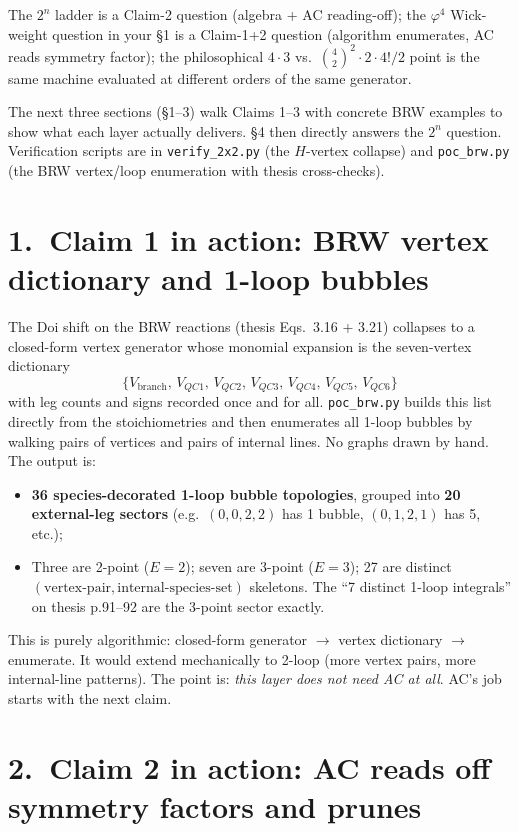 \documentclass[11pt,a4paper]{article}
\begin{document}
\noindent
The $2^n$ ladder is a Claim-2 question (algebra + AC reading-off); the
$\varphi^4$ Wick-weight question in your \S1 is a Claim-1+2 question (algorithm
enumerates, AC reads symmetry factor); the philosophical $4 \cdot 3$ vs.\
$\binom{4}{2}^2 \cdot 2 \cdot 4!/2$ point is the same machine evaluated at
different orders of the same generator.

\medskip
\noindent
The next three sections (\S 1--3) walk Claims 1--3 with concrete BRW examples
to show what each layer actually delivers.  \S 4 then directly answers the
$2^n$ question.  Verification scripts are in
\texttt{verify\_2x2.py} (the $H$-vertex collapse) and \texttt{poc\_brw.py}
(the BRW vertex/loop enumeration with thesis cross-checks).

\section*{1.\ Claim 1 in action: BRW vertex dictionary and 1-loop bubbles}

The Doi shift on the BRW reactions (thesis Eqs.\ 3.16 + 3.21) collapses to a
closed-form vertex generator whose monomial expansion is the seven-vertex
dictionary
\[
\bigl\{V_{\text{branch}},\,V_{QC1},\,V_{QC2},\,V_{QC3},\,V_{QC4},\,V_{QC5},\,V_{QC6}\bigr\}
\]
with leg counts and signs recorded once and for all.
\texttt{poc\_brw.py} builds this list directly from the stoichiometries and
then enumerates all 1-loop bubbles by walking pairs of vertices and pairs of
internal lines.  No graphs drawn by hand.  The output is:
\begin{itemize}[leftmargin=2em,itemsep=2pt]
  \item \textbf{36 species-decorated 1-loop bubble topologies}, grouped into
        \textbf{20 external-leg sectors} (e.g.\ $(0,0,2,2)$ has 1 bubble, $(0,1,2,1)$
        has 5, etc.);
  \item Three are 2-point ($E{=}2$); seven are 3-point ($E{=}3$); 27 are
        distinct $(\text{vertex-pair}, \text{internal-species-set})$
        skeletons.  The ``7 distinct 1-loop integrals'' on thesis p.91--92 are
        the 3-point sector exactly.
\end{itemize}
This is purely algorithmic: closed-form generator $\to$ vertex dictionary $\to$
enumerate.  It would extend mechanically to 2-loop (more vertex pairs, more
internal-line patterns).  The point is: \emph{this layer does not need AC at
all}.  AC's job starts with the next claim.

\section*{2.\ Claim 2 in action: AC reads off symmetry factors and prunes}
\end{document}

